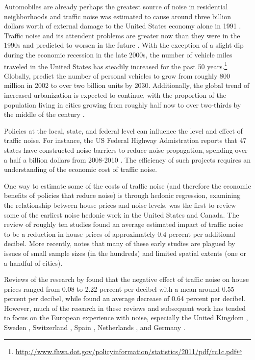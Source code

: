 \documentclass{article}\usepackage{graphicx, color}
\begin{document}
Automobiles are already perhaps the greatest source of noise in residential neighborhoods \citep{Barber2010} and traffic noise was estimated to cause around three billion dollars worth of external damage to the United States economy alone in 1991 \citep{Delucchi1998}. Traffic noise and its attendent problems are greater now than they were in the 1990s and predicted to worsen in the future \citep{Goines2007}.  With the exception of a slight dip during the economic recession in the late 2000s, the number of vehicle miles traveled in the United States has steadily increased for the past 50 years.\footnote{\url{http://www.fhwa.dot.gov/policyinformation/statistics/2011/pdf/rc1c.pdf}} Globally, \citet{Dargay2007} predict the number of personal vehicles to grow from roughly 800 million in 2002 to over two billion units by 2030. Additionally, the global trend of increased urbanization is expected to continue, with the proportion of the population living in cities growing from roughly half now to over two-thirds by the middle of the century . 

Policies at the local, state, and federal level can influence the level and effect of traffic noise. For instance, the US Federal Highway Admistration reports that 47 states have constructed noise barriers to reduce noise propagation, spending over a half a billion dollars from 2008-2010 \citep{USFHA2012}. The efficiency of such projects requires an understanding of the economic cost of traffic noise. 

One way to estimate some of the costs of traffic noise (and therefore the economic benefits of policies that reduce noise) is through hedonic regression, examining the relationship between house prices and noise levels. \citet{Nelson1982} was the first to review some of the earliest noise hedonic work in the United States and Canada. The review of roughly ten studies found an average estimated impact of traffic noise to be a reduction in house prices of approximately 0.4 percent per additional decibel. More recently, \citet{Nelson2008} notes that many of these early studies \citep[such as][]{Gamble1974, Langley1976} are plagued by issues of small sample sizes (in the hundreds) and limited spatial extents (one or a handful of cities). 

Reviews of the research by \citet{Bateman2001} found that the negative effect of traffic noise on house prices ranged from 0.08 to 2.22 percent per decibel with a mean around 0.55 percent per decibel, while \citet{Navrud2002} found an average decrease of 0.64 percent per decibel. However, much of the research in these reviews and subsequent work has tended to focus on the European experience with noise, especially the United Kingdom \citep{Day2007, Blanco2011}, Sweden \citep{Wilhelmsson2000, Andersson2010}, Switzerland \citep{Baranzini2010}, Spain \citep{MarmolejoDuarteCarlos;GonzalezTamez2009}, Netherlands \citep{Theebe2004a}, and Germany \citep{Brandt2011}. 
\end{document}
